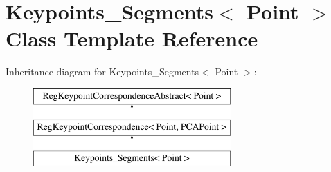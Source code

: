 \hypertarget{classKeypoints__Segments}{
\section{Keypoints\_\-Segments$<$ Point $>$ Class Template Reference}
\label{classKeypoints__Segments}
}
Inheritance diagram for Keypoints\_\-Segments$<$ Point $>$:\begin{figure}[H]
\begin{center}
\leavevmode
\includegraphics[height=3.000000cm]{classKeypoints__Segments}
\end{center}
\end{figure}
